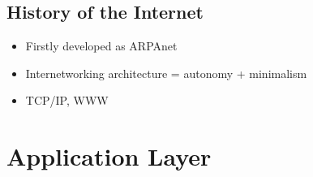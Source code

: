 \documentclass{article}
\begin{document}
\subsection{History of the Internet}
\begin{itemize}
    \item Firstly developed as ARPAnet
    \item Internetworking architecture = autonomy + minimalism
    \item TCP/IP, WWW
\end{itemize}

\section{Application Layer}
\end{document}
